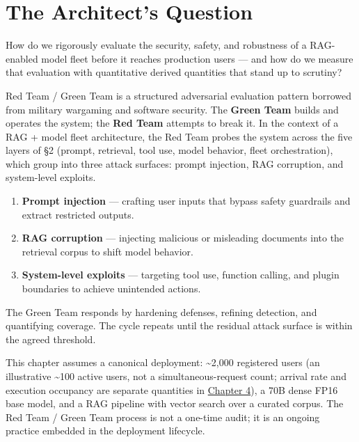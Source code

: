 \section*{The Architect's Question}\label{the-architects-question}

How do we rigorously evaluate the security, safety, and robustness of a
RAG-enabled model fleet before it reaches production users --- and how
do we measure that evaluation with quantitative derived quantities that
stand up to scrutiny?

\label{concept}


Red Team / Green Team is a structured adversarial evaluation pattern
borrowed from military wargaming and software security. The
\textbf{Green Team} builds and operates the system; the \textbf{Red
Team} attempts to break it. In the context of a RAG + model fleet
architecture, the Red Team probes the system across the five layers of
§2 (prompt, retrieval, tool use, model behavior, fleet orchestration),
which group into three attack surfaces: prompt injection, RAG
corruption, and system-level exploits.

\begin{enumerate}
\def\labelenumi{\arabic{enumi}.}
\tightlist
\item
  \textbf{Prompt injection} --- crafting user inputs that bypass safety
  guardrails and extract restricted outputs.
\item
  \textbf{RAG corruption} --- injecting malicious or misleading
  documents into the retrieval corpus to shift model behavior.
\item
  \textbf{System-level exploits} --- targeting tool use, function
  calling, and plugin boundaries to achieve unintended actions.
\end{enumerate}

The Green Team responds by hardening defenses, refining detection, and
quantifying coverage. The cycle repeats until the residual attack
surface is within the agreed threshold.

This chapter assumes a canonical deployment: \textasciitilde2,000
registered users (an illustrative \textasciitilde100 active users, not a
simultaneous-request count; arrival rate and execution occupancy are
separate quantities in \hyperref[chap:4]{Chapter 4}), a 70B dense FP16 base model, and a
RAG pipeline with vector search over a curated corpus. The Red Team /
Green Team process is not a one-time audit; it is an ongoing practice
embedded in the deployment lifecycle.

